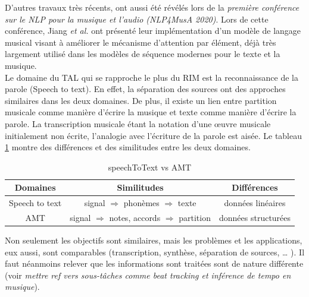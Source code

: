
D’autres travaux
très récents, ont aussi été révélés lors de la \textit{première conférence sur
le NLP pour la musique et l’audio (NLP4MusA 2020)}. Lors de cette conférence,
Jiang \textit{et al.} \cite{Jiang2020DiscoveringMR} ont présenté leur
implémentation d’un modèle de langage musical visant à améliorer le mécanisme
d’attention par élément, déjà très largement utilisé dans les modèles de
séquence modernes pour le texte et la musique.\\
Le domaine du TAL qui se rapproche le plus du RIM est la reconnaissance de la
parole (Speech to text). En effet, la séparation des sources ont des approches
similaires dans les deux domaines. De plus, il existe un lien entre partition
musicale comme manière d’écrire la musique et texte comme manière d’écrire la
parole. La transcription musicale étant la notation d’une œuvre musicale
initialement non écrite, l’analogie avec l’écriture de la parole est aisée. Le
tableau \ref{spToTxt_vs_TAM} montre des différences et des similitudes entre
les deux domaines.

\begin{table}[h]
	\centering
	\begin{tabular}{|c|c|c|} \hline
		Domaines & Similitudes & Différences \\ \hline
		Speech to text & signal $\Rightarrow$ phonèmes $\Rightarrow$
        texte & données linéaires\\
		AMT & signal $\Rightarrow$ notes, accords $\Rightarrow$ partition & données
        structurées\\ \hline
	\end{tabular}
	\caption{speechToText vs AMT}
	\label{spToTxt_vs_TAM}
\end{table}
Non seulement les objectifs sont similaires, mais les problèmes et les
applications, eux aussi, sont comparables (transcription, synthèse, séparation
de sources, … ). Il faut néanmoins relever que les informations sont traitées
sont de nature différente (voir \textit{mettre ref vers sous-tâches comme beat
tracking et inférence de tempo en musique}).

